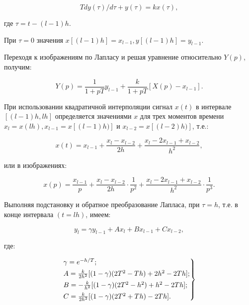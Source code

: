 \begin{equation}
    Tdy(\tau)/d\tau + y(\tau) = kx(\tau),
\end{equation}

где $\tau = t - (l - 1)h$.

При $\tau = 0$ значения $x[(l - 1)h] = x_{l - 1}, y[(l - 1)h] = y_{l - 1}$.

Переходя к изображениям по Лапласу и решая уравнение относительно $Y(p)$, получим:

\begin{equation}
    Y(p) = \frac{1}{1 + pT}y_{l - 1}+\frac{k}{1 + pT}[X(p) - x_{l - 1}].
\end{equation}

При использовании квадратичной интерполяции сигнал $x(t)$ в интервале $[(l - 1)h, lh]$ определяется значениями $x$ для трех моментов времени $x_l = x(lh), x_{l - 1} = x[(l - 1)h)]$ и $x_{l - 2} = x[(l - 2)h)]$, т.е.:

\begin{equation}
    x(t) = x_{l - 1} + \frac{x_l - x_{l - 2}}{2h} + \frac{x_l - 2x_{l - 1}+ x_{l - 2}}{h^2},
\end{equation}

или в изображениях:

\begin{equation}
    x(p) = \frac{x_{l - 1}}{p} + \frac{x_l - x_{l - 2}}{2h}\cdot\frac{1}{p^2} + \frac{x_l - 2x_{l - 1} + x_{l - 2}}{h^2}\cdot\frac{1}{p^3}.
\end{equation}

Выполняя подстановку и обратное преобразование Лапласа, при $\tau = h$, т.е. в конце интервала $(t = lh)$, имеем:

\begin{equation}
    y_l = \gamma y_{l - 1} + Ax_l + Bx_{l - 1} + Cx_{l - 2},
\end{equation}

где:

\begin{equation}
    \begin{rcases}
        \gamma = e^{-h/T};\\
        A = \frac{k}{2h^2}[(1 - \gamma)(2T^2 - Th) + 2h^2 - 2Th];\\
        B = -\frac{k}{h^2}[(1 - \gamma)(2T^2 - h^2) + h^2 - 2Th];\\
        C = \frac{k}{2h^2}[(1 - \gamma)(2T^2 + Th) - 2Th].
    \end{rcases}
\end{equation}

